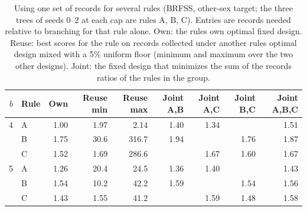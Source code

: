 \begin{table}[h]
\centering
\caption{Using one set of records for several rules (BRFSS, other-sex target; the three trees of seeds 0--2 at each cap are rules A, B, C). Entries are records needed relative to branching for that rule alone. Own: the rule\textquotesingle s own optimal fixed design. Reuse: best scores for the rule on records collected under another rule\textquotesingle s optimal design mixed with a 5\% uniform floor (minimum and maximum over the two other designs). Joint: the fixed design that minimizes the sum of the records ratios of the rules in the group.}
\label{tab:reuse}
\small
\begin{tabular}{rlrrrrrrr}
\toprule
$b$ & Rule & Own & Reuse min & Reuse max & Joint A,B & Joint A,C & Joint B,C & Joint A,B,C \\
\midrule
4 & A & 1.00 & 1.97 & 2.14 & 1.40 & 1.34 &  & 1.51 \\
 & B & 1.75 & 30.6 & 316.7 & 1.94 &  & 1.76 & 1.87 \\
 & C & 1.52 & 1.69 & 286.6 &  & 1.67 & 1.60 & 1.67 \\
5 & A & 1.26 & 20.4 & 24.5 & 1.36 & 1.40 &  & 1.43 \\
 & B & 1.54 & 10.2 & 42.2 & 1.59 &  & 1.54 & 1.56 \\
 & C & 1.43 & 1.55 & 41.2 &  & 1.59 & 1.48 & 1.58 \\
\bottomrule
\end{tabular}
\end{table}
